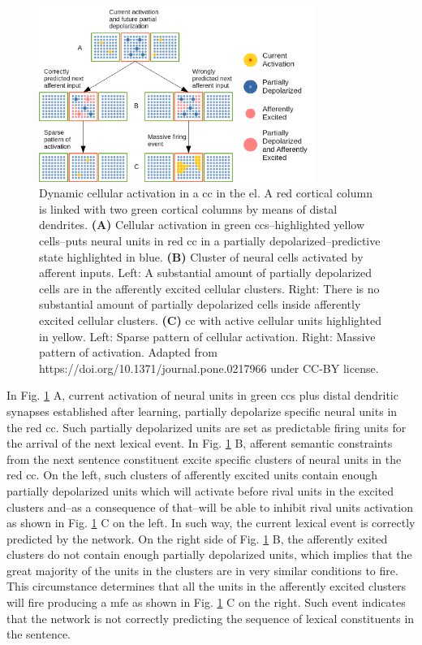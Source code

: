 {\begin{figure}[ht!]
    \centering
    \includegraphics[width=0.8\textwidth]{Activation1.png}
    \caption{Dynamic cellular activation in a \gls{cc} in the \gls{el}.
    A red cortical column is linked with two green cortical columns by means of distal dendrites.
    \textbf{(A)} Cellular activation in green \glspl{cc}--highlighted yellow cells--puts neural units
    in red \gls{cc} in a partially depolarized--predictive state highlighted in blue.
    \textbf{(B)} Cluster of neural cells activated by afferent inputs.
    Left: A substantial amount of partially depolarized cells are in the afferently excited cellular clusters.
    Right: There is no substantial amount of partially depolarized cells inside afferently excited cellular clusters.
    \textbf{(C)} \gls{cc} with active cellular units highlighted in yellow.
    Left: Sparse pattern of cellular activation.
    Right: Massive pattern of activation.
    Adapted from https://doi.org/10.1371/journal.pone.0217966 under CC-BY license.}
    \label{fig:Activation1}
\end{figure}

In Fig. \ref{fig:Activation1} A, current activation of neural units in green \glspl{cc} plus distal dendritic synapses established after learning, partially depolarize specific neural units in the red \gls{cc}. Such partially depolarized units are set as predictable firing units for the arrival of the next lexical event. In Fig. \ref{fig:Activation1} B, afferent semantic constraints from the next sentence constituent excite specific clusters of neural units in the red \gls{cc}. On the left, such clusters of afferently excited units contain enough partially depolarized units which will activate before rival units in the excited clusters and--as a consequence of that--will be able to inhibit rival units activation as shown in Fig. \ref{fig:Activation1} C on the left. In such way, the current lexical event is correctly predicted by the network. On the right side of Fig. \ref{fig:Activation1} B, the afferently exited clusters do not contain enough partially depolarized units, which implies that the great majority of the units in the clusters are in very similar conditions to fire. This circumstance determines that all the units in the afferently excited clusters will fire producing a \gls{mfe} as shown in Fig. \ref{fig:Activation1} C on the right. Such event indicates that the network is not correctly predicting the sequence of lexical constituents in the sentence.
}
